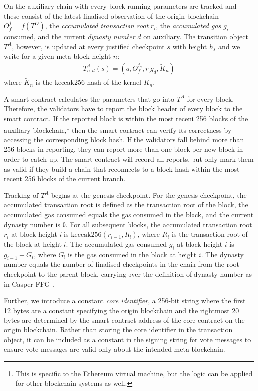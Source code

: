 \documentclass[12pt,a4paper]{article}
\begin{document}
On the auxiliary chain with every block running parameters are tracked and these consist of the latest finalised observation of the origin blockchain $O^j_f= f(T^O)$, the \emph{accumulated transaction root} $r_i$, the \emph{accumulated gas} $g_i$ consumed, and the current \emph{dynasty number} $d$ on auxiliary.
The transition object $T^A$, however, is updated at every justified checkpoint $s$ with height $h_s$ and we write for a given meta-block height $n$:
\begin{align*}
  T^A_{n,d}(s) = (d, O^{j_d}_f, r_, g_d, \tilde{K}_n)
\end{align*}
where $\tilde{K}_n$ is the keccak256 hash of the kernel $K_n$.

A smart contract calculates the parameters that go into $T^A$ for every block.
Therefore, the validators have to report the block header of every block to the smart contract.
If the reported block is within the most recent 256 blocks of the auxiliary blockchain,\footnote{
	This is specific to the Ethereum virtual machine, but the logic can be applied for other blockchain systems as well.
}
then the smart contract can verify its correctness by accessing the corresponding block hash.
If the validators fall behind more than 256 blocks in reporting, they can report more than one block per new block in order to catch up.
The smart contract will record all reports, but only mark them as valid if they build a chain that reconnects to a block hash within the most recent 256 blocks of the current branch.

Tracking of $T^A$ begins at the genesis checkpoint.
For the genesis checkpoint, the accumulated transaction root is defined as the transaction root of the block, the accumulated gas consumed equals the gas consumed in the block, and the current dynasty number is 0.
For all subsequent blocks, the accumulated transaction root $r_i$ at block height $i$ is $\text{keccak256}(r_{i-1}, R_i)$, where $R_i$ is the transaction root of the block at height $i$.
The accumulated gas consumed $g_i$ at block height $i$ is $g_{i-1} + G_i$, where $G_i$ is the gas consumed in the block at height $i$.
The dynasty number equals the number of finalised checkpoints in the chain from the root checkpoint to the parent block, carrying over the definition of dynasty number as in Casper FFG \cite{casperffg}.

Further, we introduce a constant \emph{core identifier}, a 256-bit string where the first 12 bytes are a constant specifying the origin blockchain and the rightmost 20 bytes are determined by the smart contract address of the core contract on the origin blockchain.
Rather than storing the core identifier in the transaction object, it can be included as a constant in the signing string for vote messages to ensure vote messages are valid only about the intended meta-blockchain.
\end{document}
